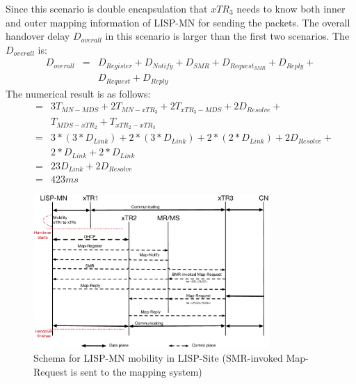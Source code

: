 Since this scenario is double encapsulation that $xTR_3$ needs to know both inner and outer mapping information of LISP-MN for sending the packets. The overall handover delay $D_{overall}$ in this scenario is larger than the first two scenarios. The $D_{overall}$ is:
\begin{eqnarray}
D_{overall} &=& D_{Register} + D_{Notify} + D_{SMR} + D_{Request_{SMR}} + D_{Reply} +  \nonumber \\
& & D_{Request}+ D_{Reply} 
\end{eqnarray}
The numerical result is as follows:
\begin{eqnarray}
&=& 3T_{MN-MDS} + 2T_{MN-xTR_3} + 2T_{xTR_3-MDS} + 2D_{Resolve} +   \nonumber \\
& & T_{MDS-xTR_2} + T_{xTR_2-xTR_3}   \nonumber \\
&=& 3* (3*D_{Link}) + 2*(3*D_{Link}) + 2*(2*D_{Link}) + 2D_{Resolve} +  \nonumber \\
& & 2*D_{Link} + 2*D_{Link} \nonumber \\
&=& 23D_{Link} + 2D_{Resolve}   \nonumber \\
&=& 423 ms \nonumber
\end{eqnarray}
\begin{figure}[!t]
	\centering
	\includegraphics[width=0.8\textwidth]{Pics/Mobility_double_encap_schema_SMR_askMDS_simplify}
	\caption{Schema for LISP-MN mobility in LISP-Site (SMR-invoked Map-Request is sent to the mapping system)}
	\label{Mobility_double_encap_schema_SMR_askMDS_simplify}
\end{figure}

